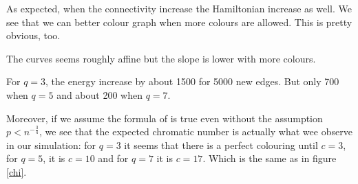 \documentclass[a4paper, 11pt]{article}
\begin{document}
As expected, when the connectivity increase the Hamiltonian increase as well. We see that we can better colour graph when more colours are allowed. This is pretty obvious, too.

The curves seems roughly affine but the slope is lower with more colours.

For $q=3$, the energy increase by about 1500 for 5000 new edges. But only 700 when $q=5$ and about 200 when $q=7$.

Moreover, if we assume the formula of \cite{coja2008chromatic} is true even without the assumption $p < n^{-\frac{3}{4}}$, we see that the expected chromatic number is actually what wee observe in our simulation: for $q=3$ it seems that there is a perfect colouring until $c=3$, for $q=5$, it is $c=10$ and for $q=7$ it is $c=17$. Which is the same as in figure \ref{chi}.

\FloatBarrier



\end{document}
